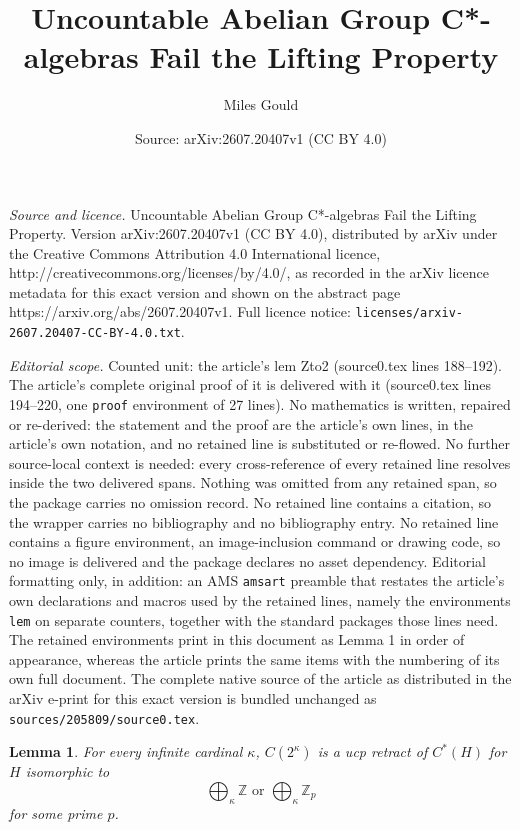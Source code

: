 \documentclass[10pt,a4paper]{amsart}
\title{Uncountable Abelian Group C*-algebras Fail the Lifting Property}
\author{Miles Gould}
\date{Source: arXiv:2607.20407v1 (CC BY 4.0)}
\newtheorem{lem}{Lemma}
\begin{document}
\maketitle

\noindent\emph{Source and licence.} Uncountable Abelian Group C*-algebras Fail the Lifting Property. Version arXiv:2607.20407v1 (CC BY 4.0), distributed by arXiv under the Creative Commons Attribution 4.0 International licence, http://creativecommons.org/licenses/by/4.0/, as recorded in the arXiv licence metadata for this exact version and shown on the abstract page https://arxiv.org/abs/2607.20407v1. Full licence notice: \texttt{licenses/arxiv-2607.20407-CC-BY-4.0.txt}.\par\smallskip

\noindent\textit{Editorial scope.} Counted unit: the article's lem Zto2 (source0.tex lines 188--192). The article's complete original proof of it is delivered with it (source0.tex lines 194--220, one \texttt{proof} environment of 27 lines). No mathematics is written, repaired or re-derived: the statement and the proof are the article's own lines, in the article's own notation, and no retained line is substituted or re-flowed.  No further source-local context is needed: every cross-reference of every retained line resolves inside the two delivered spans.  Nothing was omitted from any retained span, so the package carries no omission record.  No retained line contains a citation, so the wrapper carries no bibliography and no bibliography entry.  No retained line contains a figure environment, an image-inclusion command or drawing code, so no image is delivered and the package declares no asset dependency.  Editorial formatting only, in addition: an AMS \texttt{amsart} preamble that restates the article's own declarations and macros used by the retained lines, namely the environments \texttt{lem} on separate counters, together with the standard packages those lines need.  The retained environments print in this document as Lemma 1 in order of appearance, whereas the article prints the same items with the numbering of its own full document.  The complete native source of the article as distributed in the arXiv e-print for this exact version is bundled unchanged as \texttt{sources/205809/source0.tex}.
\begin{lem}\label{Zto2}
    For every infinite cardinal $\kappa$, $C(2^\kappa)$ is a ucp retract of $C^*(H)$ for $H$ isomorphic to
    \[\bigoplus_{\kappa}\mathbb{Z}\text{ or }\bigoplus_{\kappa}\mathbb{Z}_p\]
    for some prime $p$.
\end{lem}
\end{document}
